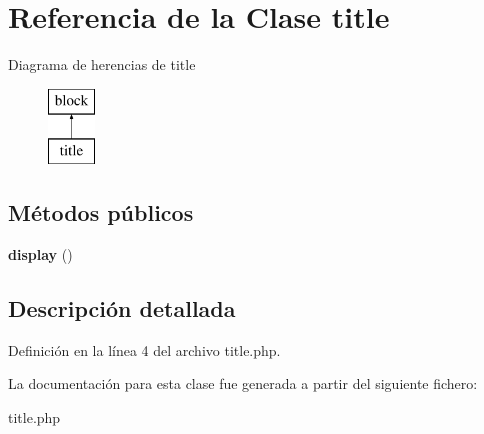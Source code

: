 \hypertarget{classtitle}{\section{\-Referencia de la \-Clase title}
\label{classtitle}
}
\-Diagrama de herencias de title\begin{figure}[H]
\begin{center}
\leavevmode
\includegraphics[height=2.000000cm]{classtitle}
\end{center}
\end{figure}
\subsection*{\-Métodos públicos}
\begin{DoxyCompactItemize}
\item 
\hypertarget{classtitle_a0b55e34d6485e20a3dfd4a6efd341ed8}{{\bfseries display} ()}\label{classtitle_a0b55e34d6485e20a3dfd4a6efd341ed8}

\end{DoxyCompactItemize}


\subsection{\-Descripción detallada}


\-Definición en la línea 4 del archivo title.\-php.



\-La documentación para esta clase fue generada a partir del siguiente fichero\-:\begin{DoxyCompactItemize}
\item 
title.\-php\end{DoxyCompactItemize}
